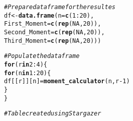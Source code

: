\documentclass[]{article}\usepackage[]{graphicx}\usepackage[]{color}
\makeatletter
\newcommand{\hlnum}[1]{\textcolor[rgb]{0.686,0.059,0.569}{#1}}%
\newcommand{\hlcom}[1]{\textcolor[rgb]{0.678,0.584,0.686}{\textit{#1}}}%
\newcommand{\hlopt}[1]{\textcolor[rgb]{0,0,0}{#1}}%
\newcommand{\hlstd}[1]{\textcolor[rgb]{0.345,0.345,0.345}{#1}}%
\newcommand{\hlkwa}[1]{\textcolor[rgb]{0.161,0.373,0.58}{\textbf{#1}}}%
\newcommand{\hlkwb}[1]{\textcolor[rgb]{0.69,0.353,0.396}{#1}}%
\newcommand{\hlkwc}[1]{\textcolor[rgb]{0.333,0.667,0.333}{#1}}%
\newcommand{\hlkwd}[1]{\textcolor[rgb]{0.737,0.353,0.396}{\textbf{#1}}}%
\newenvironment{kframe}{%
 \def\at@end@of@kframe{}%
 \ifinner\ifhmode%
  \def\at@end@of@kframe{\end{minipage}}%
  \begin{minipage}{\columnwidth}%
 \fi\fi%
 \def\FrameCommand##1{\hskip\@totalleftmargin \hskip-\fboxsep
 \colorbox{shadecolor}{##1}\hskip-\fboxsep
     \hskip-\linewidth \hskip-\@totalleftmargin \hskip\columnwidth}%
 \MakeFramed {\advance\hsize-\width
   \@totalleftmargin\z@ \linewidth\hsize
   \@setminipage}}%
 {\par\unskip\endMakeFramed%
 \at@end@of@kframe}
\newenvironment{knitrout}{}{} %
\makeatother
\begin{document}
\begin{knitrout}
\color{fgcolor}\begin{kframe}
\begin{alltt}
\hlcom{#Prepare dataframe for the resultes}
\hlstd{df} \hlkwb{<-} \hlkwd{data.frame}\hlstd{(}\hlkwc{n} \hlstd{=} \hlkwd{c}\hlstd{(}\hlnum{1}\hlopt{:}\hlnum{20}\hlstd{),}
                 \hlkwc{First_Moment} \hlstd{=} \hlkwd{c}\hlstd{(}\hlkwd{rep}\hlstd{(}\hlnum{NA}\hlstd{,} \hlnum{20}\hlstd{)),}
                 \hlkwc{Second_Moment} \hlstd{=} \hlkwd{c}\hlstd{(}\hlkwd{rep}\hlstd{(}\hlnum{NA}\hlstd{,} \hlnum{20}\hlstd{)),}
                 \hlkwc{Third_Moment} \hlstd{=} \hlkwd{c}\hlstd{(}\hlkwd{rep}\hlstd{(}\hlnum{NA}\hlstd{,} \hlnum{20}\hlstd{)))}

\hlcom{#Populate the dataframe}
\hlkwa{for} \hlstd{(r} \hlkwa{in} \hlnum{2}\hlopt{:}\hlnum{4}\hlstd{) \{}
  \hlkwa{for} \hlstd{(n} \hlkwa{in} \hlnum{1}\hlopt{:}\hlnum{20}\hlstd{)\{}
    \hlstd{df[[r]][n]} \hlkwb{=} \hlkwd{moment_calculator}\hlstd{(n, r} \hlopt{-} \hlnum{1}\hlstd{)}
  \hlstd{\}}
\hlstd{\}}

\hlcom{#Table created using Stargazer}
\end{alltt}
\end{kframe}
\end{knitrout}
\end{document}
